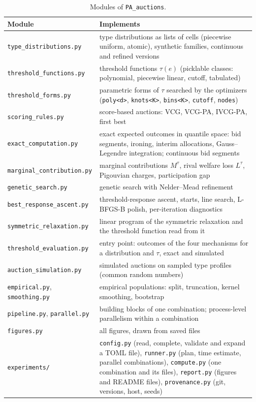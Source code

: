 \documentclass[11pt]{article}
\newcommand{\code}[1]{\texttt{#1}}
\begin{document}
\begin{table}[ht]
\centering\small
\begin{tabularx}{\linewidth}{@{}l L@{}}
\toprule
Module & Implements \\
\midrule
\code{type\_distributions.py} & type distributions as lists of cells (piecewise uniform, atomic), synthetic families, continuous and refined versions \\
\code{threshold\_functions.py} & threshold functions $\tau(e)$ (picklable classes: polynomial, piecewise linear, cutoff, tabulated) \\
\code{threshold\_forms.py} & parametric forms of $\tau$ searched by the optimizers (\code{poly<d>}, \code{knots<K>}, \code{bins<K>}, \code{cutoff}, \code{nodes}) \\
\code{scoring\_rules.py} & score-based auctions: VCG, VCG-PA, IVCG-PA, first best \\
\code{exact\_computation.py} & exact expected outcomes in quantile space: bid segments, ironing, interim allocations, Gauss--Legendre integration; continuous bid segments \\
\code{marginal\_contribution.py} & marginal contributions $M^\tau$, rival welfare loss $L^\tau$, Pigouvian charges, participation gap \\
\code{genetic\_search.py} & genetic search with Nelder--Mead refinement \\
\code{best\_response\_ascent.py} & threshold-response ascent, starts, line search, L-BFGS-B polish, per-iteration diagnostics \\
\code{symmetric\_relaxation.py} & linear program of the symmetric relaxation and the threshold function read from it \\
\code{threshold\_evaluation.py} & entry point: outcomes of the four mechanisms for a distribution and $\tau$, exact and simulated \\
\code{auction\_simulation.py} & simulated auctions on sampled type profiles (common random numbers) \\
\code{empirical.py}, \code{smoothing.py} & empirical populations: split, truncation, kernel smoothing, bootstrap \\
\code{pipeline.py}, \code{parallel.py} & building blocks of one combination; process-level parallelism within a combination \\
\code{figures.py} & all figures, drawn from saved files \\
\code{experiments/} & \code{config.py} (read, complete, validate and expand a TOML file), \code{runner.py} (plan, time estimate, parallel combinations), \code{compute.py} (one combination and its files), \code{report.py} (figures and README files), \code{provenance.py} (git, versions, host, seeds) \\
\bottomrule
\end{tabularx}
\caption{Modules of \code{PA\_auctions}.}
\label{tab:modules}
\end{table}
\end{document}
